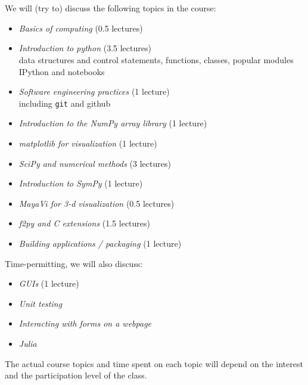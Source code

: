 \documentclass[11pt]{article}
\newenvironment{squishlist}
  {\begin{itemize}
    \addtolength{\itemsep}{-0.33\baselineskip}
   }
  { \end{itemize} }
\begin{document}
\ \\[-2mm]
 \\
We will (try to) discuss the following topics in the course:
%
\begin{squishlist}
\item {\em Basics of computing} (0.5 lectures)

\item {\em Introduction to python} (3.5 lectures) \\
  data structures and control statements, functions, classes, popular modules \\
  IPython and notebooks

\item {\em Software engineering practices} (1 lecture) \\
  including {\tt git} and github

\item {\em Introduction to the NumPy array library} (1 lecture)

\item {\em matplotlib for visualization} (1 lecture)

\item {\em SciPy and numerical methods} (3 lectures)

\item {\em Introduction to SymPy} (1 lecture)

\item {\em MayaVi for 3-d visualization} (0.5 lectures)

\item {\em f2py and C extensions} (1.5 lectures)

\item {\em Building applications / packaging} (1 lecture)
\end{squishlist}

\noindent Time-permitting, we will also discuss:
\begin{squishlist}
\item {\em GUIs} (1 lecture)

\item {\em Unit testing}

\item {\em Interacting with forms on a webpage}

\item {\em Julia}
\end{squishlist}
%
\noindent The actual course topics and time spent on each topic will depend on the
interest and the participation level of the class.
\end{document}
